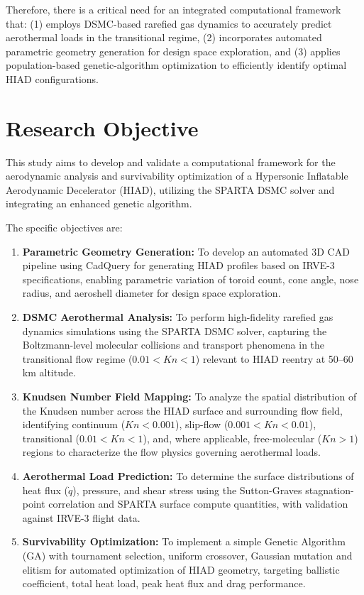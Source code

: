 Therefore, there is a critical need for an integrated computational framework that: (1) employs DSMC-based rarefied gas dynamics to accurately predict aerothermal loads in the transitional regime, (2) incorporates automated parametric geometry generation for design space exploration, and (3) applies population-based genetic-algorithm optimization to efficiently identify optimal HIAD configurations.

\section{Research Objective}
This study aims to develop and validate a computational framework for the aerodynamic analysis and survivability optimization of a Hypersonic Inflatable Aerodynamic Decelerator (HIAD), utilizing the SPARTA DSMC solver and integrating an enhanced genetic algorithm.

The specific objectives are:
\begin{enumerate}
    \item \textbf{Parametric Geometry Generation:} To develop an automated 3D CAD pipeline using CadQuery for generating HIAD profiles based on IRVE-3 specifications, enabling parametric variation of toroid count, cone angle, nose radius, and aeroshell diameter for design space exploration.

    \item \textbf{DSMC Aerothermal Analysis:} To perform high-fidelity rarefied gas dynamics simulations using the SPARTA DSMC solver, capturing the Boltzmann-level molecular collisions and transport phenomena in the transitional flow regime ($0.01 < Kn < 1$) relevant to HIAD reentry at 50--60 km altitude.

    \item \textbf{Knudsen Number Field Mapping:} To analyze the spatial distribution of the Knudsen number across the HIAD surface and surrounding flow field, identifying continuum ($Kn < 0.001$), slip-flow ($0.001 < Kn < 0.01$), transitional ($0.01 < Kn < 1$), and, where applicable, free-molecular ($Kn > 1$) regions to characterize the flow physics governing aerothermal loads.

    \item \textbf{Aerothermal Load Prediction:} To determine the surface distributions of heat flux ($\dot{q}$), pressure, and shear stress using the Sutton-Graves stagnation-point correlation and SPARTA surface compute quantities, with validation against IRVE-3 flight data.


    \item \textbf{Survivability Optimization:} To implement a simple Genetic Algorithm (GA) with tournament selection, uniform crossover, Gaussian mutation and elitism for automated optimization of HIAD geometry, targeting ballistic coefficient, total heat load, peak heat flux and drag performance.
\end{enumerate}

